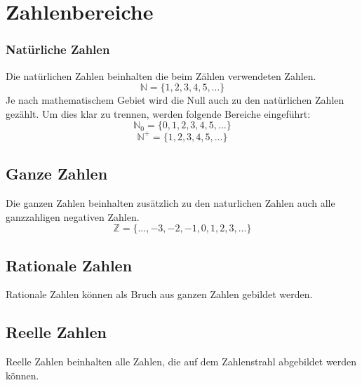 



\section{Zahlenbereiche}
\subsubsection{Natürliche Zahlen}
Die natürlichen Zahlen beinhalten die beim Zählen verwendeten Zahlen. 
\[ \boxed{\mathbb{N} = \{1, 2, 3, 4, 5, \dots\}} \]
Je nach mathematischem Gebiet wird die Null auch zu den natürlichen Zahlen 
gezählt. Um dies klar zu trennen, werden folgende Bereiche eingeführt: 
\[ \boxed{\mathbb{N}_0 = \{0, 1, 2, 3, 4, 5, \dots\}} \]
\[ \boxed{\mathbb{N}^+ = \{1, 2, 3, 4, 5, \dots\}} \]

\subsection{Ganze Zahlen}
Die ganzen Zahlen beinhalten zusätzlich zu den naturlichen Zahlen auch alle 
ganzzahligen negativen Zahlen. 
\[ \boxed{\mathbb{Z} = \{\dots, -3, -2, -1, 0, 1, 2, 3, \dots\}} \]

\subsection{Rationale Zahlen}
Rationale Zahlen können als Bruch aus ganzen Zahlen gebildet werden. 

\subsection{Reelle Zahlen}
Reelle Zahlen beinhalten alle Zahlen, die auf dem Zahlenstrahl abgebildet 
werden können. 

